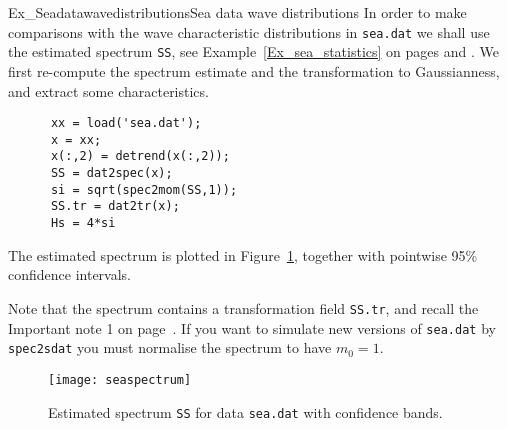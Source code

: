 \begin{rtex}{Ex_Seadatawavedistributions}{Sea data wave distributions}
In order to make comparisons with the wave characteristic
distributions in  {\tt sea.dat} we shall use the estimated spectrum \verb+SS+, see
Example~\ref{Ex_sea_statistics} on pages \pageref{Ex_sea_statistics}
and \pageref{fig2_spc}.
We first re-compute the spectrum estimate and the transformation to
Gaussianness, and extract some characteristics.

{\small\begin{verbatim}
      xx = load('sea.dat');
      x = xx;
      x(:,2) = detrend(x(:,2));
      SS = dat2spec(x);
      si = sqrt(spec2mom(SS,1));
      SS.tr = dat2tr(x);
      Hs = 4*si
\end{verbatim}}
\noindent The estimated spectrum is plotted in Figure~\ref{fig:seaspectrum},
together with pointwise 95\% confidence intervals. 

Note that the spectrum contains a transformation 
field {\tt SS.tr}, and recall the {\sc Important note 1} on page~\pageref{ImpNote_1}. 
If you want to simulate new versions of {\tt sea.dat} by {\tt spec2sdat} you must 
normalise the spectrum to have $m_0 = 1$.
\end{rtex}

\begin{figure}[tbh]
\centerline{
\texttt{[image: seaspectrum]}
}
\vspace{-3mm}
\caption[Estimated sea spectrum]{Estimated spectrum {\tt SS} for data
{\tt sea.dat} with confidence bands.}
\label{fig:seaspectrum}
\end{figure}

